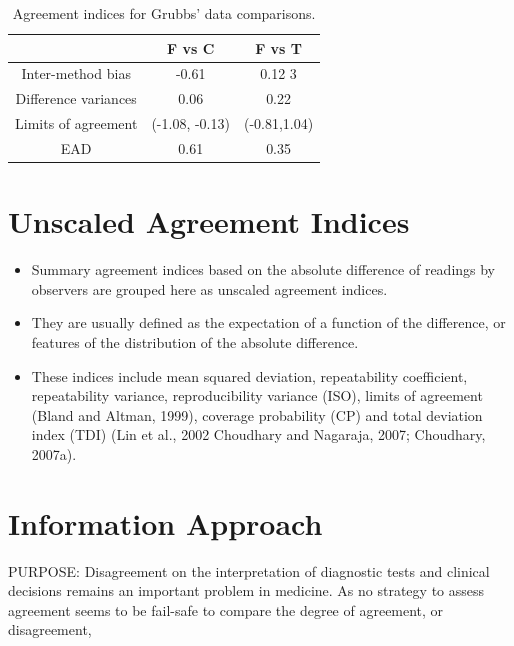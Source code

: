\documentclass[12pt, a4paper]{report}
\theoremstyle{plain}
\theoremstyle{definition}
\theoremstyle{remark}
\begin{document}
	\begin{table}[ht]
		\begin{center}
			\begin{tabular}{|c|c|c|}
				\hline
				& F vs C & F vs T  \\
				\hline
				Inter-method bias & -0.61 & 0.12 3 \\
				Difference variances & 0.06 & 0.22  \\
				Limits of agreement & (-1.08,	-0.13) & (-0.81,1.04) \\
				EAD & 0.61 & 0.35  \\
				\hline
			\end{tabular}
			\caption{Agreement indices for Grubbs' data comparisons.}
		\end{center}
	\end{table}
	
	\section{Unscaled Agreement Indices}
	\begin{itemize}
		\item Summary agreement indices based on the absolute difference of readings by observers are
		grouped here as unscaled agreement indices. 
		\item They are usually defined as the expectation
		of a function of the difference, or features of the distribution of the absolute difference.
		
		\item
		These indices include mean squared deviation, repeatability coefficient, repeatability variance,
		reproducibility variance (ISO), limits of agreement (Bland and Altman, 1999), coverage
		probability (CP) and total deviation index (TDI) (Lin et al., 2002 Choudhary and Nagaraja,
		2007; Choudhary, 2007a).
	\end{itemize}
	
	
	\section{Information Approach}
	
	PURPOSE: Disagreement on the interpretation of diagnostic tests and clinical decisions 
	remains an important problem in medicine. As no strategy to assess agreement seems to be 
	fail-safe to compare the degree of agreement, or disagreement, 
	
\end{document}
